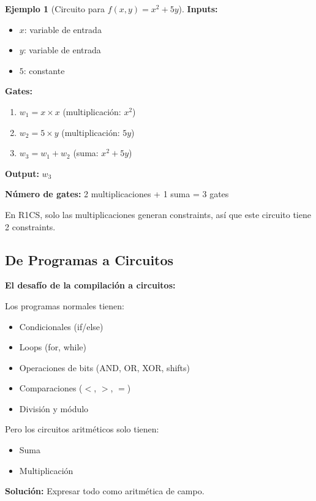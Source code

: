 \documentclass[11pt,a4paper,twoside,openright]{book}
\theoremstyle{definition}
\newtheorem{example}{Ejemplo}[chapter]
\theoremstyle{plain}
\theoremstyle{remark}
\begin{document}
\begin{example}[Circuito para $f(x, y) = x^2 + 5y$]
\textbf{Inputs:}
\begin{itemize}
    \item $x$: variable de entrada
    \item $y$: variable de entrada
    \item $5$: constante
\end{itemize}

\textbf{Gates:}
\begin{enumerate}
    \item $w_1 = x \times x$ (multiplicación: $x^2$)
    \item $w_2 = 5 \times y$ (multiplicación: $5y$)
    \item $w_3 = w_1 + w_2$ (suma: $x^2 + 5y$)
\end{enumerate}

\textbf{Output:} $w_3$

\textbf{Número de gates:} 2 multiplicaciones + 1 suma = 3 gates

En R1CS, solo las multiplicaciones generan constraints, así que este circuito tiene 2 constraints.
\end{example}

\subsection{De Programas a Circuitos}

\begin{keyidea}
\textbf{El desafío de la compilación a circuitos:}

Los programas normales tienen:
\begin{itemize}
    \item Condicionales (if/else)
    \item Loops (for, while)
    \item Operaciones de bits (AND, OR, XOR, shifts)
    \item Comparaciones ($<$, $>$, $=$)
    \item División y módulo
\end{itemize}

Pero los circuitos aritméticos solo tienen:
\begin{itemize}
    \item Suma
    \item Multiplicación
\end{itemize}

\textbf{Solución:} Expresar todo como aritmética de campo.
\end{keyidea}
\end{document}
